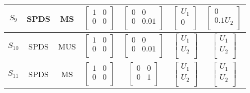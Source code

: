 \begin{table}
\begin{center}
{\begin{tabular}{|c|c|c|c|c|c|c|}
$S_9$   &SPDS          & MS   &$\begin{bmatrix} 1 & 0 \\ 0 &0\\\end{bmatrix}$ &$\begin{bmatrix} 0 & 0 \\ 0 &0.01\\\end{bmatrix}$ &$\begin{bmatrix} U_1 \\ 0\\\end{bmatrix}$ &$\begin{bmatrix} 0 \\ 0.1 U_2\\\end{bmatrix}$ \\ \hline
$S_{10}$   &SPDS          & MUS   &$\begin{bmatrix} 1 & 0 \\ 0 &0\\\end{bmatrix}$ &$\begin{bmatrix} 0 & 0 \\ 0 &0.01\\\end{bmatrix}$ &$\begin{bmatrix} U_1 \\ U_2\\\end{bmatrix}$ &$\begin{bmatrix} U_1 \\ U_2\\\end{bmatrix}$ \\ \hline
$S_{11}$   &SPDS          & MS   &$\begin{bmatrix} 1 & 0 \\ 0 &0\\\end{bmatrix}$ &$\begin{bmatrix} 0 & 0 \\ 0 &1\\\end{bmatrix}$ &$\begin{bmatrix} U_1 \\ U_2\\\end{bmatrix}$ &$\begin{bmatrix} U_1 \\ U_2\\\end{bmatrix}$ \\ \hline
\end{tabular}
}
\end{center}
\end{table}

